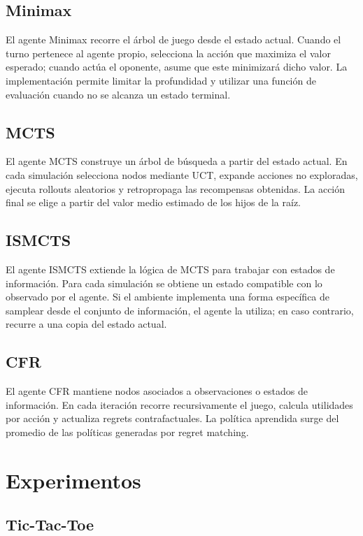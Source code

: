 \documentclass[letterpaper,12pt]{article}
\begin{document}
\subsection{Minimax}

El agente Minimax recorre el árbol de juego desde el estado actual. Cuando el turno pertenece al agente propio, selecciona la acción que maximiza el valor esperado; cuando actúa el oponente, asume que este minimizará dicho valor. La implementación permite limitar la profundidad y utilizar una función de evaluación cuando no se alcanza un estado terminal.

\subsection{MCTS}

El agente MCTS construye un árbol de búsqueda a partir del estado actual. En cada simulación selecciona nodos mediante UCT, expande acciones no exploradas, ejecuta rollouts aleatorios y retropropaga las recompensas obtenidas. La acción final se elige a partir del valor medio estimado de los hijos de la raíz.

\subsection{ISMCTS}

El agente ISMCTS extiende la lógica de MCTS para trabajar con estados de información. Para cada simulación se obtiene un estado compatible con lo observado por el agente. Si el ambiente implementa una forma específica de samplear desde el conjunto de información, el agente la utiliza; en caso contrario, recurre a una copia del estado actual.

\subsection{CFR}

El agente CFR mantiene nodos asociados a observaciones o estados de información. En cada iteración recorre recursivamente el juego, calcula utilidades por acción y actualiza regrets contrafactuales. La política aprendida surge del promedio de las políticas generadas por regret matching.

\clearpage
\section{Experimentos}

\subsection{Tic-Tac-Toe}
\end{document}
